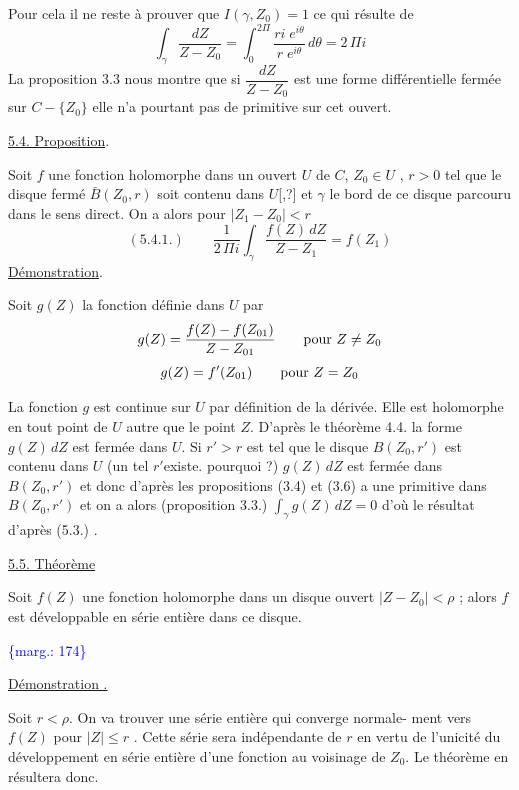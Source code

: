 \documentclass[11pt]{article}
\newcommand{\scanpage}[1]{\par\bigskip\noindent{\small\sffamily[scan #1]}\par}
\newcommand{\mspage}[1]{{\small\sffamily[p.\,#1]}}
\let\over\relax
\newcommand{\over}[2]{\textcolor{gray}{#1}\textcolor{blue}{\ensuremath{^{\!\nearrow}}#2}}
\newcommand{\margin}[1]{\textcolor{blue}{\{\textsf{marg.:} #1\}}}
\newcommand{\uline}[1]{\underline{#1}}
\newcommand{\unsure}[1]{[#1?]}
\begin{document}
Pour cela il ne reste à prouver que $I(\gamma, Z_0) = 1$ ce qui résulte de
\[ \int_{\gamma} \frac{dZ}{Z - Z_0} = \int_0^{2\Pi} \frac{ri\; e^{i\theta}}{r\; e^{i\theta}}\, d\theta = 2\,\Pi i \]
La proposition 3.3 nous montre que si $\dfrac{dZ}{Z - Z_0}$ est une forme différentielle
fermée sur $C - \{Z_0\}$ elle n'a pourtant pas de primitive sur cet ouvert.

\uline{5.4. Proposition}.

Soit $f$ une fonction holomorphe dans un ouvert $U$ de $C$, $Z_0 \in U$ ,
$r > 0$ tel que le disque fermé $\bar{B}(Z_0, r)$ soit contenu dans $U$\unsure{,} et $\gamma$ le bord
de ce disque parcouru dans le sens direct. On a alors pour $|Z_1 - Z_0| < r$
\[ (5.4.1.) \qquad \frac{1}{2\,\Pi i} \int_{\gamma} \frac{f(Z)\, dZ}{Z - Z_1} = f(Z_1) \]
\uline{Démonstration}.

Soit $g(Z)$ la fonction définie dans $U$ par
\[ g(Z) = \frac{f(Z) - f(Z_{\over{0}{1}})}{Z - Z_{\over{0}{1}}} \qquad \text{pour } Z \neq Z_0 \]
\[ g(Z) = f'(Z_{\over{0}{1}}) \qquad \text{pour } Z = Z_0 \]

La fonction $g$ est continue sur $U$ par définition de la dérivée.
Elle est holomorphe en tout point de $U$ autre que le point $Z$. D'après le
théorème 4.4. la forme $g(Z)\, dZ$ est fermée dans $U$. Si $r' > r$ est tel que
le disque $B(Z_0, r')$ est contenu dans $U$ (un tel $r'$existe. pourquoi ?)
$g(Z)\, dZ$ est fermée dans $B(Z_0, r')$ et donc d'après les propositions (3.4)
et (3.6) a une primitive dans $B(Z_0, r')$ et on a alors (proposition 3.3.)
$\int_{\gamma} g(Z)\, dZ = 0$ d'où le résultat d'après (5.3.) .

\uline{5.5. Théorème}

Soit $f(Z)$ une fonction holomorphe dans un disque ouvert $|Z - Z_0| < \rho$ ;
alors $f$ est développable en série entière dans ce disque.

\margin{174}

\clearpage
\scanpage{119/175}
\mspage{- 14 -}

\uline{Démonstration .}

Soit \( r < \rho \). On va trouver une série entière qui converge normale-%
ment vers \( f(Z) \) pour \( |Z| \leq r \) . Cette série sera indépendante de \( r \) en vertu
de l'unicité du développement en série entière d'une fonction au voisinage de
\( Z_0 \). Le théorème en résultera donc.
\end{document}

